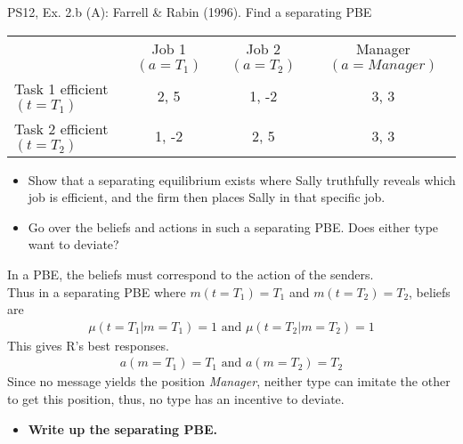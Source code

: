 \begin{frame}{PS12, Ex. 2.b (A): Farrell \& Rabin (1996). Find a separating PBE}
    \begin{table}
      \begin{tabular}{l|c|c|c|}
          \multicolumn{1}{c}{} & \multicolumn{1}{c}{Job 1 $(a=T_1)$} & \multicolumn{1}{c}{Job 2 $(a=T_2)$} & \multicolumn{1}{c}{Manager $(a=Manager)$} \\\cline{2-4}
           Task 1 efficient $(t=T_1)$ & 2, 5 & 1, -2 & 3, 3 \\\cline{2-4}
           Task 2 efficient $(t=T_2)$ & 1, -2 & 2, 5 & 3, 3 \\\cline{2-4}
      \end{tabular}
    \end{table}\vspace{-12pt}
    \begin{itemize}
      \item[(b)] Show that a separating equilibrium exists where Sally truthfully reveals which job is efficient, and the firm then places Sally in that specific job.
      \item[Step 1:] Go over the beliefs and actions in such a separating PBE. Does either type want to deviate?
    \end{itemize}\vspace{-6pt}
    In a PBE, the beliefs must correspond to the action of the senders.\\
    Thus in a separating PBE where $m(t=T_1)=T_1$ and $m(t=T_2)=T_2$, beliefs are\vspace{-2pt}
    \begin{align*}
      \mu(t=T_1|m=T_1)=1\text{ and }\mu(t=T_2|m=T_2)=1
    \end{align*}
    This gives R's best responses.
    \vspace{-2pt}
    \begin{align*}
      a(m=T_1)=T_1\text{ and }a(m=T_2)=T_2
    \end{align*}
    Since no message yields the position \textit{Manager}, neither type can imitate the other to get this position, thus, no type has an incentive to deviate.\vspace{-6pt}
    \begin{itemize}
      \item[Step 2:] \textbf{Write up the separating PBE.}
    \end{itemize}
    \vfill\null
\end{frame}

